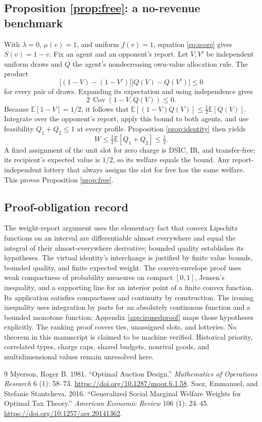 \documentclass[11pt]{article}
\newcommand{\E}{\mathbb E}
\begin{document}
\subsection{Proposition \ref{prop:free}: a no-revenue benchmark}

With $\lambda=0$, $\mu(v)=1$, and uniform $f(v)=1$, equation \eqref{eq:score} gives $S(v)=1-v$. Fix an agent and an opponent's report. Let $V,V'$ be independent uniform draws and $Q$ the agent's nondecreasing own-value allocation rule. The product
\[
\bigl[(1-V)-(1-V')\bigr]\bigl[Q(V)-Q(V')\bigr]\le0
\]
for every pair of draws. Expanding its expectation and using independence gives
\[
2\,\operatorname{Cov}(1-V,Q(V))\le0.
\]
Because $\E[1-V]=1/2$, it follows that $\E[(1-V)Q(V)]\le\tfrac12\E[Q(V)]$. Integrate over the opponent's report, apply this bound to both agents, and use feasibility $Q_1+Q_2\le1$ at every profile. Proposition \ref{prop:identity} then yields
\[
W\le\tfrac12\E[Q_1+Q_2]\le\tfrac12.
\]
A fixed assignment of the unit slot for zero charge is DSIC, IR, and transfer-free; its recipient's expected value is $1/2$, so its welfare equals the bound. Any report-independent lottery that always assigns the slot for free has the same welfare. This proves Proposition \ref{prop:free}.

\subsection{Proof-obligation record}

The weight-report argument uses the elementary fact that convex Lipschitz functions on an interval are differentiable almost everywhere and equal the integral of their almost-everywhere derivative; bounded quality establishes its hypotheses. The virtual identity's interchange is justified by finite value bounds, bounded quality, and finite expected weight. The convex-envelope proof uses weak compactness of probability measures on compact $[0,1]$, Jensen's inequality, and a supporting line for an interior point of a finite convex function. Its application satisfies compactness and continuity by construction. The ironing inequality uses integration by parts for an absolutely continuous function and a bounded monotone function; Appendix \ref{app:ironedproof} maps those hypotheses explicitly. The ranking proof covers ties, unassigned slots, and lotteries. No theorem in this manuscript is claimed to be machine verified. Historical priority, correlated types, charge caps, shared budgets, nonrival goods, and multidimensional values remain unresolved here.

\begin{thebibliography}{9}
Myerson, Roger B. 1981. ``Optimal Auction Design.'' \emph{Mathematics of Operations Research} 6 (1): 58--73. \url{https://doi.org/10.1287/moor.6.1.58}.
Saez, Emmanuel, and Stefanie Stantcheva. 2016. ``Generalized Social Marginal Welfare Weights for Optimal Tax Theory.'' \emph{American Economic Review} 106 (1): 24--45. \url{https://doi.org/10.1257/aer.20141362}.
\end{thebibliography}
\end{document}
